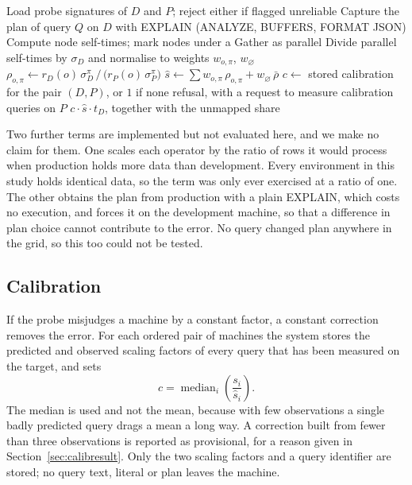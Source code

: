\documentclass[runningheads]{llncs}
\begin{document}
\begin{algorithm}[t]
\caption{Predict the production runtime of a query}
\label{alg:predict}
\begin{algorithmic}[1]
\State Load probe signatures of $D$ and $P$; reject either if flagged unreliable
\State Capture the plan of query $Q$ on $D$ with EXPLAIN (ANALYZE, BUFFERS, FORMAT JSON)
\State Compute node self-times; mark nodes under a Gather as parallel
\State Divide parallel self-times by $\sigma_D$ and normalise to weights $w_{o,\pi}$, $w_{\varnothing}$
  \State $\rho_{o,\pi} \gets r_D(o)\,\sigma_D^{\pi} \,/\, \big(r_P(o)\,\sigma_P^{\pi}\big)$
\EndFor
\State $\hat{s} \gets \sum w_{o,\pi}\,\rho_{o,\pi} + w_{\varnothing}\,\bar{\rho}$
\State $c \gets$ stored calibration for the pair $(D,P)$, or $1$ if none
  \State \Return refusal, with a request to measure calibration queries on $P$
\EndIf
\State \Return $c \cdot \hat{s} \cdot t_D$, together with the unmapped share
\end{algorithmic}
\end{algorithm}

Two further terms are implemented but not evaluated here, and we make no claim
for them. One scales each operator by the ratio of rows it would process when
production holds more data than development. Every environment in this study
holds identical data, so the term was only ever exercised at a ratio of one.
The other obtains the plan from production with a plain EXPLAIN, which costs
no execution, and forces it on the development machine, so that a difference
in plan choice cannot contribute to the error. No query changed plan anywhere
in the grid, so this too could not be tested.

\subsection{Calibration}
\label{sec:calib}

If the probe misjudges a machine by a constant factor, a constant correction
removes the error. For each ordered pair of machines the system stores the
predicted and observed scaling factors of every query that has been measured
on the target, and sets
\begin{equation}
c = \operatorname{median}_{i}\left(\frac{s_i}{\hat{s}_i}\right).
\end{equation}
The median is used and not the mean, because with few observations a single
badly predicted query drags a mean a long way. A correction built from fewer
than three observations is reported as provisional, for a reason given in
Section~\ref{sec:calibresult}. Only the two scaling factors and a query
identifier are stored; no query text, literal or plan leaves the machine.
\end{document}
